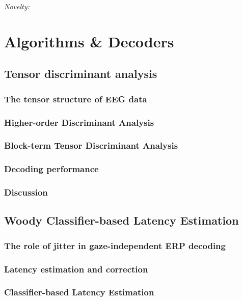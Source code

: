 \emph{Novelty:}


\part{Algorithms \& Decoders}


\chapter{Tensor discriminant analysis}
\section{The tensor structure of EEG data}
\section{Higher-order Discriminant Analysis}
\section{Block-term Tensor Discriminant Analysis}
\section{Decoding performance}
\section{Discussion}

\chapter{Woody Classifier-based Latency Estimation}
\section{The role of jitter in gaze-independent ERP decoding}
\section{Latency estimation and correction}
\section{Classifier-based Latency Estimation}
